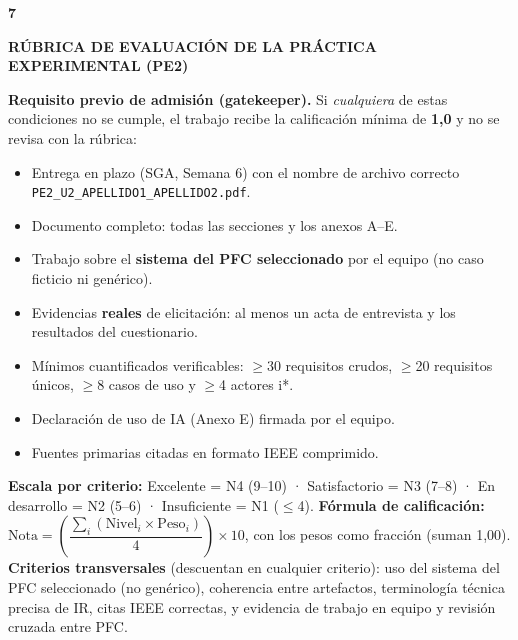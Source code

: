 \documentclass[11pt,a4paper]{article}
\newcommand{\secband}[2]{%
  \par\vspace{9pt}\noindent
  {\setlength{\fboxsep}{0pt}%
   \colorbox{secdark}{\parbox[c][20pt][c]{0.05\textwidth}{\centering\textbf{\color{white}\small #1}}}%
   \colorbox{secblue}{\parbox[c][20pt][c]{0.95\textwidth}{\hspace{8pt}\textbf{\color{white}\small #2}}}%
  }\par\vspace{5pt}}
\begin{document}
\clearpage
\secband{7}{RÚBRICA DE EVALUACIÓN DE LA PRÁCTICA EXPERIMENTAL (PE2)}

\begin{goldbox}
\small\textbf{\color{notagreen}Requisito previo de admisión (gatekeeper).} Si \emph{cualquiera} de estas condiciones no se cumple, el trabajo recibe la calificación mínima de \textbf{1,0} y no se revisa con la rúbrica:
\begin{itemize}[itemsep=0pt,topsep=2pt]
\item Entrega en plazo (SGA, Semana 6) con el nombre de archivo correcto \texttt{PE2\_U2\_APELLIDO1\_APELLIDO2.pdf}.
\item Documento completo: todas las secciones y los anexos A–E.
\item Trabajo sobre el \textbf{sistema del PFC seleccionado} por el equipo (no caso ficticio ni genérico).
\item Evidencias \textbf{reales} de elicitación: al menos un acta de entrevista y los resultados del cuestionario.
\item Mínimos cuantificados verificables: $\ge$30 requisitos crudos, $\ge$20 requisitos únicos, $\ge$8 casos de uso y $\ge$4 actores i*.
\item Declaración de uso de IA (Anexo E) firmada por el equipo.
\item Fuentes primarias citadas en formato IEEE comprimido.
\end{itemize}
\end{goldbox}

\small
\textbf{Escala por criterio:} Excelente = N4 (9–10) · Satisfactorio = N3 (7–8) · En desarrollo = N2 (5–6) · Insuficiente = N1 ($\le$4).\quad
\textbf{Fórmula de calificación:} $\text{Nota} = \left(\dfrac{\sum_i (\text{Nivel}_i \times \text{Peso}_i)}{4}\right)\times 10$, con los pesos como fracción (suman 1,00).\\
\textbf{Criterios transversales} (descuentan en cualquier criterio): uso del sistema del PFC seleccionado (no genérico), coherencia entre artefactos, terminología técnica precisa de IR, citas IEEE correctas, y evidencia de trabajo en equipo y revisión cruzada entre PFC.
\end{document}
